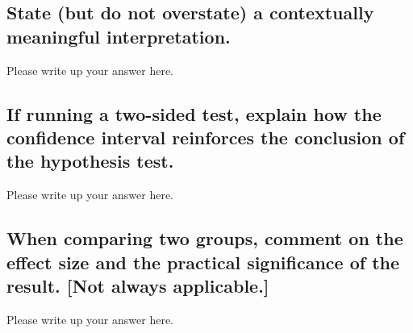 \documentclass[
]{book}
\begin{document}
\hypertarget{state-but-do-not-overstate-a-contextually-meaningful-interpretation.-1}{%
\subsection*{State (but do not overstate) a contextually meaningful interpretation.}\label{state-but-do-not-overstate-a-contextually-meaningful-interpretation.-1}}

Please write up your answer here.

\hypertarget{if-running-a-two-sided-test-explain-how-the-confidence-interval-reinforces-the-conclusion-of-the-hypothesis-test.}{%
\subsection*{If running a two-sided test, explain how the confidence interval reinforces the conclusion of the hypothesis test.}\label{if-running-a-two-sided-test-explain-how-the-confidence-interval-reinforces-the-conclusion-of-the-hypothesis-test.}}

Please write up your answer here.

\hypertarget{when-comparing-two-groups-comment-on-the-effect-size-and-the-practical-significance-of-the-result.-not-always-applicable.}{%
\subsection*{When comparing two groups, comment on the effect size and the practical significance of the result. {[}Not always applicable.{]}}\label{when-comparing-two-groups-comment-on-the-effect-size-and-the-practical-significance-of-the-result.-not-always-applicable.}}

Please write up your answer here.

  
\end{document}
